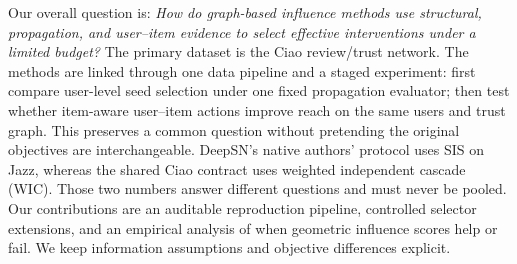 \documentclass[10pt,twocolumn]{article}
\begin{document}
Our overall question is: \emph{How do graph-based influence methods use structural, propagation, and user--item evidence to select effective interventions under a limited budget?} The primary dataset is the Ciao review/trust network. The methods are linked through one data pipeline and a staged experiment: first compare user-level seed selection under one fixed propagation evaluator; then test whether item-aware user--item actions improve reach on the same users and trust graph. This preserves a common question without pretending the original objectives are interchangeable. DeepSN's native authors' protocol uses SIS on Jazz, whereas the shared Ciao contract uses weighted independent cascade (WIC). Those two numbers answer different questions and must never be pooled. Our contributions are an auditable reproduction pipeline, controlled selector extensions, and an empirical analysis of when geometric influence scores help or fail. We keep information assumptions and objective differences explicit.
\end{document}
